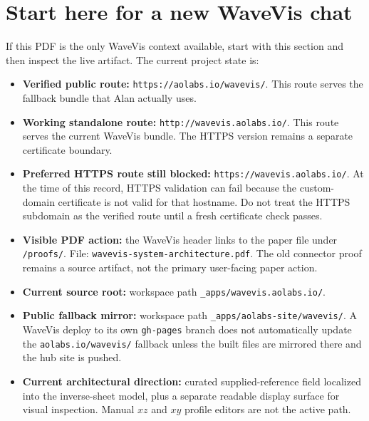 \documentclass[12pt,letterpaper]{article}
\newcommand{\code}[1]{\texttt{#1}}
\begin{document}
\section{Start here for a new WaveVis chat}

If this PDF is the only WaveVis context available, start with this section and then inspect the live artifact. The current project state is:
\begin{itemize}
  \item \textbf{Verified public route:} \code{https://aolabs.io/wavevis/}. This route serves the fallback bundle that Alan actually uses.
  \item \textbf{Working standalone route:} \code{http://wavevis.aolabs.io/}. This route serves the current WaveVis bundle. The HTTPS version remains a separate certificate boundary.
  \item \textbf{Preferred HTTPS route still blocked:} \code{https://wavevis.aolabs.io/}. At the time of this record, HTTPS validation can fail because the custom-domain certificate is not valid for that hostname. Do not treat the HTTPS subdomain as the verified route until a fresh certificate check passes.
  \item \textbf{Visible PDF action:} the WaveVis header links to the paper file under \code{/proofs/}. File: \code{wavevis-system-architecture.pdf}. The old connector proof remains a source artifact, not the primary user-facing paper action.
  \item \textbf{Current source root:} workspace path \code{\_apps/wavevis.aolabs.io/}.
  \item \textbf{Public fallback mirror:} workspace path \code{\_apps/aolabs-site/wavevis/}. A WaveVis deploy to its own \code{gh-pages} branch does not automatically update the \code{aolabs.io/wavevis/} fallback unless the built files are mirrored there and the hub site is pushed.
  \item \textbf{Current architectural direction:} curated supplied-reference field localized into the inverse-sheet model, plus a separate readable display surface for visual inspection. Manual \(xz\) and \(xy\) profile editors are not the active path.

\end{itemize}
\end{document}
